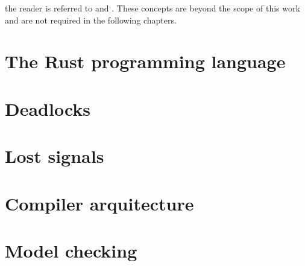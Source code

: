 the reader is referred to \cite{murata1989} and \cite{peterson1981}.
These concepts are beyond the scope of this work and are not required in the following chapters.

\section{The Rust programming language}

\section{Deadlocks}

\section{Lost signals}

\section{Compiler arquitecture}

\section{Model checking}

\bigskip